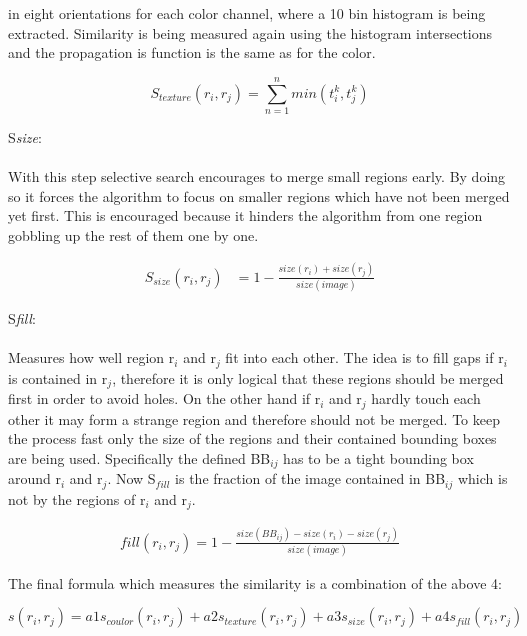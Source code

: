 in eight orientations for each color channel, where a 10 bin histogram is being extracted. Similarity is being measured
again using the histogram intersections and the propagation is function is the same as for the color.\cite{selectivesearch}
\begin{center}
    \begin{equation*}
        S_{texture}(r_i,r_j) = \sum_{n=1}^{n} min(t_i^{k},t_j^{k})
    \end{equation*}\cite{selectivesearch}
\end{center}
\large{S}\emph{size}: \\ \\
With this step selective search encourages to merge small regions early. By doing so it forces the algorithm to focus
on smaller regions which have not been merged yet first. This is encouraged because it hinders the algorithm from one
region gobbling up the rest of them one by one.\cite{selectivesearch}
\begin{center}
    \begin{equation*}
        \begin{split}
            S_{size}(r_i,r_j) & = 1 - \frac{size(r_i)+size(r_j)}{size(image)}
        \end{split}
    \end{equation*}\cite{selectivesearch}
\end{center}
\large{S}\emph{fill}: \\ \\
Measures how well region r$_i$ and r$_j$ fit into each other. The idea is to fill gaps if r{$_i$} is contained in
r$_j$, therefore it is only logical that these regions should be merged first in order to avoid holes. On the other hand
if r$_i$ and r$_j$ hardly touch each other it may form a strange region and therefore should not be merged. To keep
the process fast only the size of the regions and their contained bounding boxes are being used. Specifically the defined
BB$_{ij}$ has to be a tight bounding box around r$_i$ and r$_j$. Now S$_{fill}$ is the fraction of the image
contained in BB$_{ij}$ which is not by the regions of r$_i$ and r$_j$.\cite{selectivesearch}
\begin{center}
    \begin{equation*}
        \begin{split}
            fill(r_i, r_j) = 1 - \frac{size(BB_{ij}) - size(r_i) - size(r_j)}{size(image)}
        \end{split}
    \end{equation*}\cite{selectivesearch}
\end{center}
The final formula which measures the similarity is a combination of the above 4:
\begin{center}
    \begin{equation*}
        s(r_i,r_j) = a1s_{coulor}(r_i,r_j) + a2s_{texture}(r_i,r_j) + a3s_{size}(r_i,r_j) + a4s_{fill}(r_i,r_j)
    \end{equation*}\cite{selectivesearch}
\end{center}

